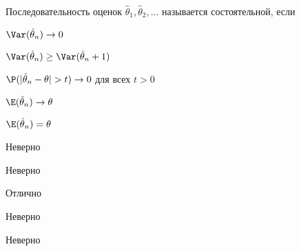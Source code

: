 
\begin{question}
Последовательность оценок \(\hat{\theta}_1, \hat{\theta}_2, \ldots\)
называется состоятельной, если
\begin{answerlist}
  \item \(\Var(\hat\theta_n) \to 0\)
  \item \(\Var(\hat\theta_n) \geq \Var(\hat\theta_n + 1)\)
  \item \(\P(|\hat\theta_n - \theta | > t) \to 0\) для всех \(t > 0\)
  \item \(\E(\hat\theta_n) \to \theta\)
  \item \(\E(\hat\theta_n) = \theta\)
\end{answerlist}
\end{question}

\begin{solution}
\begin{answerlist}
  \item Неверно
  \item Неверно
  \item Отлично
  \item Неверно
  \item Неверно
\end{answerlist}
\end{solution}


